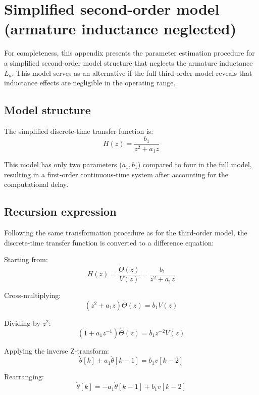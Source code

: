 \documentclass{article}
\begin{document}
	
	

	\appendix

	\section{Simplified second-order model (armature inductance neglected)}\label{app:second_order}
	
	For completeness, this appendix presents the parameter estimation procedure for a simplified second-order model structure that neglects the armature inductance $L_a$. This model serves as an alternative if the full third-order model reveals that inductance effects are negligible in the operating range.
	
	\subsection*{Model structure}
	
	The simplified discrete-time transfer function is:
	\begin{equation}
		H(z) = \frac{b_1}{z^2 + a_1 z}
	\end{equation}
	
	This model has only two parameters ($a_1, b_1$) compared to four in the full model, resulting in a first-order continuous-time system after accounting for the computational delay.
	
	\subsection*{Recursion expression}
	
	Following the same transformation procedure as for the third-order model, the discrete-time transfer function is converted to a difference equation:
	
	Starting from:
	\[
	H(z) = \frac{\dot{\Theta}(z)}{V(z)} = \frac{b_1}{z^2 + a_1 z}
	\]
	
	Cross-multiplying:
	\[
	(z^2 + a_1z)\dot{\Theta}(z) = b_1V(z)
	\]
	
	Dividing by $z^2$:
	\[
	(1 + a_1z^{-1})\dot{\Theta}(z) = b_1z^{-2}V(z)
	\]
	
	Applying the inverse Z-transform:
	\[
	\dot{\theta}[k] + a_1\dot{\theta}[k-1] = b_1 v[k-2]
	\]
	
	Rearranging:
	\begin{equation}
		\dot{\theta}[k] = -a_1\dot{\theta}[k-1] + b_1 v[k-2]
		\label{eq: difference eq simple}
	\end{equation}
	
\end{document}
